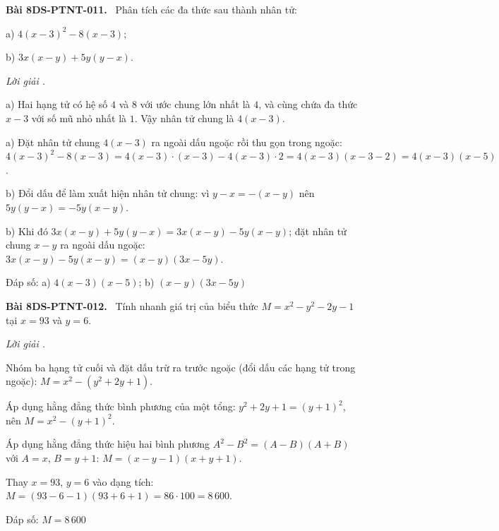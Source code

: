 \documentclass[12pt,a4paper]{article}
\newenvironment{problem}[1][]{\par\medskip\noindent\textbf{Bài #1.}\ }{\par}
\newenvironment{solution}[1][]{\par\noindent\textit{Lời giải #1.}\par}{\par}
\begin{document}
\begin{problem}[8DS-PTNT-011]
Phân tích các đa thức sau thành nhân tử:

a) $4(x - 3)^2 - 8(x - 3)$;

b) $3x(x - y) + 5y(y - x)$.

\begin{solution}
a) Hai hạng tử có hệ số $4$ và $8$ với ước chung lớn nhất là $4$, và cùng chứa đa thức $x - 3$ với số mũ nhỏ nhất là $1$. Vậy nhân tử chung là $4(x - 3)$.

a) Đặt nhân tử chung $4(x - 3)$ ra ngoài dấu ngoặc rồi thu gọn trong ngoặc: $4(x - 3)^2 - 8(x - 3) = 4(x - 3) \cdot (x - 3) - 4(x - 3) \cdot 2 = 4(x - 3)(x - 3 - 2) = 4(x - 3)(x - 5)$.

b) Đổi dấu để làm xuất hiện nhân tử chung: vì $y - x = -(x - y)$ nên $5y(y - x) = -5y(x - y)$.

b) Khi đó $3x(x - y) + 5y(y - x) = 3x(x - y) - 5y(x - y)$; đặt nhân tử chung $x - y$ ra ngoài dấu ngoặc: $3x(x - y) - 5y(x - y) = (x - y)(3x - 5y)$.

Đáp số: a) $\boxed{4(x - 3)(x - 5)}$; b) $\boxed{(x - y)(3x - 5y)}$
\end{solution}
\end{problem}

\begin{problem}[8DS-PTNT-012]
Tính nhanh giá trị của biểu thức $M = x^2 - y^2 - 2y - 1$ tại $x = 93$ và $y = 6$.

\begin{solution}
Nhóm ba hạng tử cuối và đặt dấu trừ ra trước ngoặc (đổi dấu các hạng tử trong ngoặc): $M = x^2 - (y^2 + 2y + 1)$.

Áp dụng hằng đẳng thức bình phương của một tổng: $y^2 + 2y + 1 = (y + 1)^2$, nên $M = x^2 - (y + 1)^2$.

Áp dụng hằng đẳng thức hiệu hai bình phương $A^2 - B^2 = (A - B)(A + B)$ với $A = x$, $B = y + 1$: $M = (x - y - 1)(x + y + 1)$.

Thay $x = 93$, $y = 6$ vào dạng tích: $M = (93 - 6 - 1)(93 + 6 + 1) = 86 \cdot 100 = 8\,600$.

Đáp số: $\boxed{M = 8\,600}$
\end{solution}
\end{problem}
\end{document}
